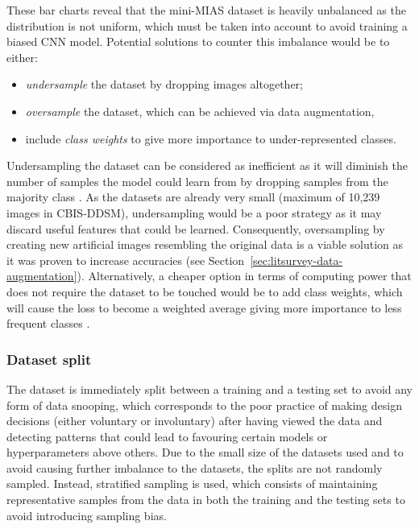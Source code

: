 These bar charts reveal that the mini-MIAS dataset is heavily unbalanced as the distribution is not uniform, which must be taken into account to avoid training a biased CNN model. Potential solutions to counter this imbalance would be to either:
\begin{itemize}
    \item \textit{undersample} the dataset by dropping images altogether;
    \item \textit{oversample} the dataset, which can be achieved via data augmentation,
    \item include \textit{class weights} to give more importance to under-represented classes. 
\end{itemize}

Undersampling the dataset can be considered as inefficient as it will diminish the number of samples the model could learn from by dropping samples from the majority class \citep{Liu2009}. As the datasets are already very small (maximum of 10,239 images in CBIS-DDSM), undersampling would be a poor strategy as it may discard useful features that could be learned. Consequently, oversampling by creating new artificial images resembling the original data is a viable solution as it was proven to increase accuracies (see Section~\ref{sec:litsurvey-data-augmentation}). Alternatively, a cheaper option in terms of computing power that does not require the dataset to be touched would be to add class weights, which will cause the loss to become a weighted average giving more importance to less frequent classes \citep{Zhu2018}.

\subsubsection{Dataset split}

The dataset is immediately split between a training and a testing set to avoid any form of data snooping, which corresponds to the poor practice of making design decisions (either voluntary or involuntary) after having viewed the data and detecting patterns that could lead to favouring certain models or hyperparameters above others. Due to the small size of the datasets used and to avoid causing further imbalance to the datasets, the splits are not randomly sampled. Instead, stratified sampling is used, which consists of maintaining representative samples from the data in both the training and the testing sets to avoid introducing sampling bias.\\

